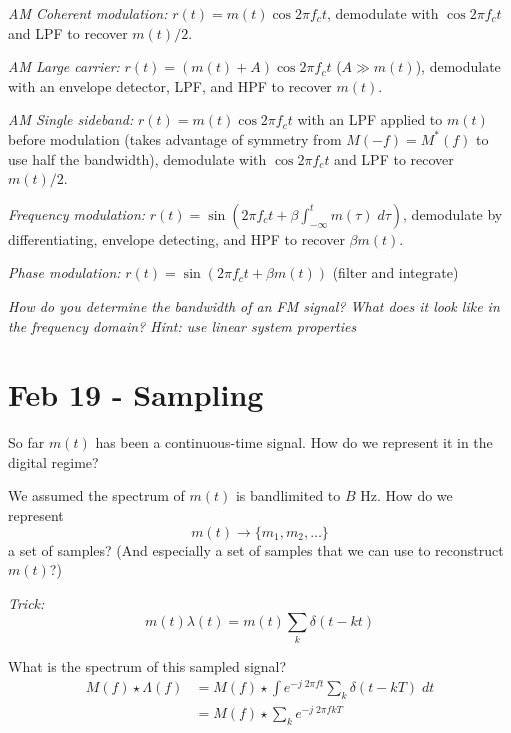 \documentclass[12pt]{report}
\begin{document}
\emph{AM Coherent modulation:} $r(t) = m(t) \cos 2\pi f_c t$, demodulate with $\cos 2\pi f_c t$ and LPF to recover $m(t)/2$.

\emph{AM Large carrier:} $r(t) = (m(t) + A) \cos 2\pi f_c t$ ($A \gg m(t)$), demodulate with an envelope detector, LPF, and HPF to recover $m(t)$.

\emph{AM Single sideband:} $r(t) = m(t) \cos 2\pi f_c t$ with an LPF applied to $m(t)$ before modulation (takes advantage of symmetry from $M(-f) = M^*(f)$ to use half the bandwidth), demodulate with $\cos 2\pi f_c t$ and LPF to recover $m(t)/2$.

\emph{Frequency modulation:} $r(t) = \sin (2\pi f_c t + \beta \int_{-\infty}^t m(\tau)\; d\tau)$, demodulate by differentiating, envelope detecting, and HPF to recover $\beta m(t)$.

\emph{Phase modulation:} $r(t) = \sin (2\pi f_c t + \beta m(t))$ (filter and integrate)

\emph{How do you determine the bandwidth of an FM signal? What does it look like in the frequency domain? Hint: use linear system properties}

\section{Feb 19 - Sampling}

So far $m(t)$ has been a continuous-time signal. How do we represent it in the digital regime?

We assumed the spectrum of $m(t)$ is bandlimited to $B$ Hz. How do we represent 
\[m(t) \to \{m_1, m_2, \dots\}\] 
a set of samples? (And especially a set of samples that we can use to reconstruct $m(t)$?)

\emph{Trick:} 
\[m(t) \lambda(t) = m(t) \sum_k \delta(t - kt)\] 

\begin{center}
\end{center}

What is the spectrum of this sampled signal?
\begin{align*}
    M(f) \star \Lambda(f) &= M(f) \star \int e^{-j\; 2\pi ft} \sum_k \delta(t - kT)\; dt\\ 
    &= M(f) \star \sum_k e^{-j\; 2\pi fkT}\\
\end{align*}
\end{document}
